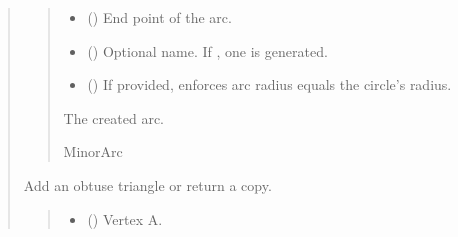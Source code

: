 \documentclass[letterpaper,10pt,english]{sphinxmanual}
\begin{document}
\begin{quote}
\begin{fulllineitems}
\begin{fulllineitems}
\begin{quote}
\begin{description}
\begin{itemize}
\item {} 
\sphinxAtStartPar
{} () \textendash{} End point of the arc.

\item {} 
\sphinxAtStartPar
{} (\sphinxstyleliteralemphasis{\sphinxupquote{ | }}) \textendash{} Optional name. If , one is generated.

\item {} 
\sphinxAtStartPar
{} (\sphinxstyleliteralemphasis{\sphinxupquote{ | }}) \textendash{} If provided, enforces arc radius equals the circle’s radius.

\end{itemize}

\sphinxAtStartPar
The created arc.

\sphinxAtStartPar
MinorArc

\end{description}\end{quote}

\end{fulllineitems}


\begin{fulllineitems}
\label{\detokenize{pygeox:pygeox.add_objects.AddNamespace.obtuse_triangle}}
\pysigstartsignatures
\pysiglinewithargsret
{}
{\sphinxparamcomma {}\sphinxparamcomma {}\sphinxparamcomma {}\sphinxparamcomma {}}
{}
\pysigstopsignatures
\sphinxAtStartPar
Add an obtuse triangle or return a copy.
\begin{quote}\begin{description}
\begin{itemize}
\item {} 
\sphinxAtStartPar
{} (\sphinxstyleliteralemphasis{\sphinxupquote{ | }}) \textendash{} Vertex A.


\end{itemize}
\end{description}
\end{quote}
\end{fulllineitems}
\end{fulllineitems}
\end{quote}
\end{document}
